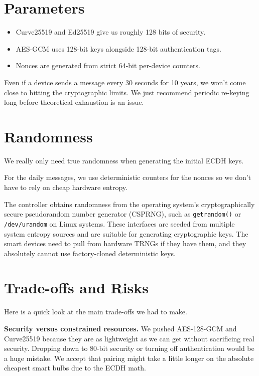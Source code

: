 \documentclass[a4paper,11pt]{article}
\begin{document}
\section{Parameters}

\begin{itemize}
    \item Curve25519 and Ed25519 give us roughly 128 bits of security.
    \item AES-GCM uses 128-bit keys alongside 128-bit authentication tags.
    \item Nonces are generated from strict 64-bit per-device counters.
\end{itemize}

Even if a device sends a message every 30 seconds for 10 years, we won't come close to hitting the cryptographic limits. We just recommend periodic re-keying long before theoretical exhaustion is an issue.

\section{Randomness}

We really only need true randomness when generating the initial ECDH keys.

For the daily messages, we use deterministic counters for the nonces so we don't have to rely on cheap hardware entropy.

The controller obtains randomness from the operating system's cryptographically secure pseudorandom number generator (CSPRNG), such as \texttt{getrandom()} or \texttt{/dev/urandom} on Linux systems. These interfaces are seeded from multiple system entropy sources and are suitable for generating cryptographic keys. The smart devices need to pull from hardware TRNGs if they have them, and they absolutely cannot use factory-cloned deterministic keys.

\section{Trade-offs and Risks}\label{sec:tradeoffs}

Here is a quick look at the main trade-offs we had to make.

\textbf{Security versus constrained resources.} We pushed AES-128-GCM and Curve25519 because they are as lightweight as we can get without sacrificing real security. Dropping down to 80-bit security or turning off authentication would be a huge mistake. We accept that pairing might take a little longer on the absolute cheapest smart bulbs due to the ECDH math.
\end{document}
